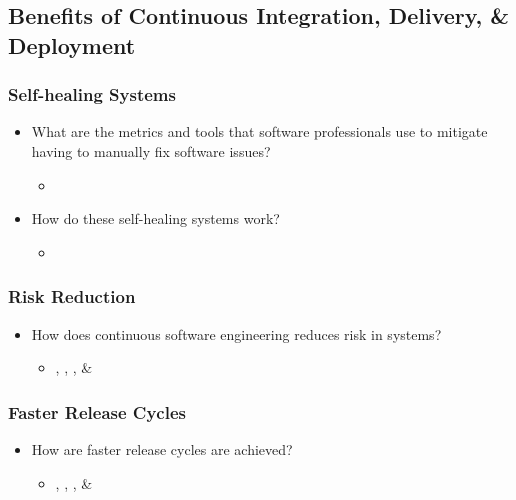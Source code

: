\documentclass[12pt,a4paper]{article}
\begin{document}
    \subsection{Benefits of Continuous Integration, Delivery, \& Deployment}
        \subsubsection{Self-healing Systems}
        \begin{itemize}[noitemsep]
            \item What are the metrics and tools that software professionals use to mitigate having to manually fix software issues?
            \begin{itemize}
                \item \cite{bosch_2014}
            \end{itemize}
            \item How do these self-healing systems work?
            \begin{itemize}
                \item \cite{bosch_2014}
            \end{itemize}
        \end{itemize}
        \subsubsection{Risk Reduction}
        \begin{itemize}[noitemsep]
            \item How does continuous software engineering reduces risk in systems?
            \begin{itemize}
                \item \cite{atkinson_edwards_2018}, \cite{bosch_2014}, \cite{stackify_2018}, \& \cite{stahl_2017} \cite{stackify_2018}
            \end{itemize}
        \end{itemize}
        \subsubsection{Faster Release Cycles}
        \begin{itemize}[noitemsep]
            \item How are faster release cycles are achieved?
            \begin{itemize}
                \item \cite{atkinson_edwards_2018}, \cite{bosch_2014}, \cite{stackify_2018}, \& \cite{stahl_2017} \cite{stackify_2018}
            \end{itemize}
        \end{itemize}
\end{document}
